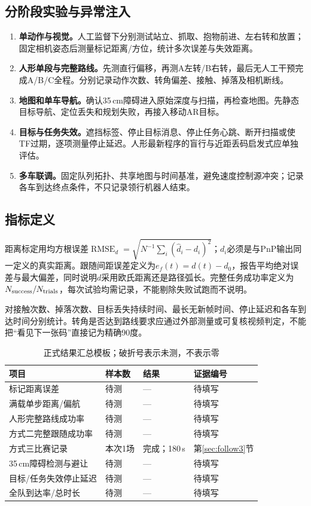 \subsection{分阶段实验与异常注入}
\begin{enumerate}
\item \textbf{单动作与视觉。}人工监督下分别测试站立、抓取、抱物前进、左右转和放置；固定相机姿态后测量标记距离/方位，统计多次误差与失效距离。
\item \textbf{人形单段与完整路线。}先测直行偏移，再测A左转/B右转，最后无人工干预完成A/B/C全程。分别记录动作次数、转角偏差、接触、掉落及相机断线。
\item \textbf{地图和单车导航。}确认35\,cm障碍进入原始深度与扫描，再检查地图。先静态目标导航、定位丢失和规划失败，再接入移动AR目标。
\item \textbf{目标与任务失效。}遮挡标签、停止目标消息、停止任务心跳、断开扫描或使TF过期，逐项测量停止延迟。人形最新程序的盲行与近距丢码启发式应单独评估。
\item \textbf{多车联调。}固定队列拓扑、共享地图与时间基准，避免速度控制源冲突；记录各车到达终点条件，不只记录领行机器人结束。
\end{enumerate}

\subsection{指标定义}
距离标定用均方根误差$\operatorname{RMSE}_d=\sqrt{N^{-1}\sum_i(\hat d_i-d_i)^2}$；$d_i$必须是与PnP输出同一定义的真实距离。跟随间距误差定义为$e_f(t)=d(t)-d_0$，报告平均绝对误差与最大偏差，同时说明$d$采用欧氏距离还是路径弧长。完整任务成功率定义为$N_{\rm success}/N_{\rm trials}$，每次试验均需记录，不能剔除失败试跑而不说明。

对接触次数、掉落次数、目标丢失持续时间、最长无新帧时间、停止延迟和各车到达时间分别统计。转角是否达到路线要求应通过外部测量或可复核视频判定，不能把“看见下一张码”直接记为精确90度。

\begin{table}[H]\centering\small
\caption{正式结果汇总模板；破折号表示未测，不表示零}
\begin{tabularx}{\linewidth}{Yp{26mm}p{26mm}p{25mm}}\toprule
项目 & 样本数 & 结果 & 证据编号\\\midrule
标记距离误差 & 待测 & --- & 待填写\\
满载单步距离/偏航 & 待测 & --- & 待填写\\
人形完整路线成功率 & 待测 & --- & 待填写\\
方式二完整跟随成功率 & 待测 & --- & 待填写\\
方式三比赛记录 & 本次1场 & 完成；180\,s & 第\ref{sec:follow3}节\\
35\,cm障碍检测与避让 & 待测 & --- & 待填写\\
目标/任务失效停止延迟 & 待测 & --- & 待填写\\
全队到达率/总时长 & 待测 & --- & 待填写\\\bottomrule
\end{tabularx}\end{table}

